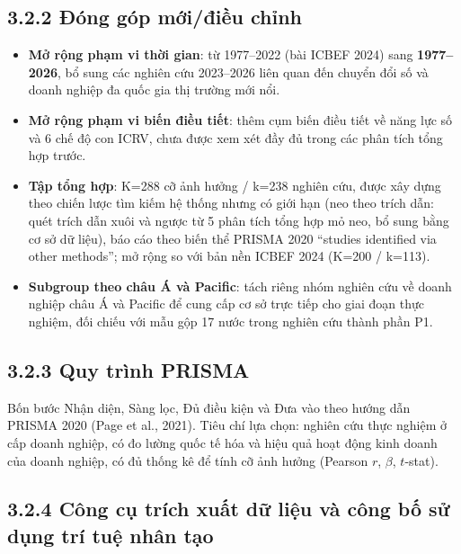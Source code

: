\documentclass[
  a4paper,
  13pt]{extreport}
\providecommand{\tightlist}{%
  \setlength{\itemsep}{0pt}\setlength{\parskip}{0pt}}
\begin{document}
\hypertarget{ux111uxf3ng-guxf3p-mux1edbiux111iux1ec1u-chux1ec9nh}{%
\subsection{3.2.2 Đóng góp mới/điều
chỉnh}\label{ux111uxf3ng-guxf3p-mux1edbiux111iux1ec1u-chux1ec9nh}}

\begin{itemize}
\tightlist
\item
  \textbf{Mở rộng phạm vi thời gian}: từ 1977--2022 (bài ICBEF 2024)
  sang \textbf{1977--2026}, bổ sung các nghiên cứu 2023--2026 liên quan
  đến chuyển đổi số và doanh nghiệp đa quốc gia thị trường mới nổi.
\item
  \textbf{Mở rộng phạm vi biến điều tiết}: thêm cụm biến điều tiết về
  năng lực số và 6 chế độ con ICRV, chưa được xem xét đầy đủ trong các
  phân tích tổng hợp trước.
\item
  \textbf{Tập tổng hợp}: K=288 cỡ ảnh hưởng / k=238 nghiên cứu, được xây
  dựng theo chiến lược tìm kiếm hệ thống nhưng có giới hạn (neo theo
  trích dẫn: quét trích dẫn xuôi và ngược từ 5 phân tích tổng hợp mỏ
  neo, bổ sung bằng cơ sở dữ liệu), báo cáo theo biến thể PRISMA 2020
  ``studies identified via other methods''; mở rộng so với bản nền ICBEF
  2024 (K=200 / k=113).
\item
  \textbf{Subgroup theo châu Á và Pacific}: tách riêng nhóm nghiên cứu
  về doanh nghiệp châu Á và Pacific để cung cấp cơ sở trực tiếp cho giai
  đoạn thực nghiệm, đối chiếu với mẫu gộp 17 nước trong nghiên cứu thành
  phần P1.
\end{itemize}

\hypertarget{quy-truxecnh-prisma}{%
\subsection{3.2.3 Quy trình PRISMA}\label{quy-truxecnh-prisma}}

Bốn bước Nhận diện, Sàng lọc, Đủ điều kiện và Đưa vào theo hướng dẫn
PRISMA 2020 (Page et al., 2021). Tiêu chí lựa chọn: nghiên cứu thực
nghiệm ở cấp doanh nghiệp, có đo lường quốc tế hóa và hiệu quả hoạt động
kinh doanh của doanh nghiệp, có đủ thống kê để tính cỡ ảnh hưởng
(Pearson \(r\), \(\beta\), \(t\)-stat).

\hypertarget{cuxf4ng-cux1ee5-truxedch-xuux1ea5t-dux1eef-liux1ec7u-vuxe0-cuxf4ng-bux1ed1-sux1eed-dux1ee5ng-truxed-tuux1ec7-nhuxe2n-tux1ea1o}{%
\subsection{3.2.4 Công cụ trích xuất dữ liệu và công bố sử dụng trí tuệ
nhân
tạo}\label{cuxf4ng-cux1ee5-truxedch-xuux1ea5t-dux1eef-liux1ec7u-vuxe0-cuxf4ng-bux1ed1-sux1eed-dux1ee5ng-truxed-tuux1ec7-nhuxe2n-tux1ea1o}}
\end{document}
